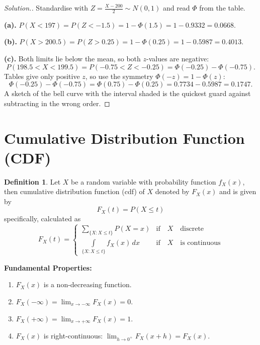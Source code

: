 \documentclass[12pt,a4paper]{report}
\theoremstyle{definition}
\newtheorem{definition}[thm]{Definition}
\theoremstyle{plain}
\theoremstyle{definition}
\newenvironment{solution}
  {\renewcommand{\qedsymbol}{}\begin{proof}[\textit{Solution}.]}
  {\end{proof}}
\begin{document}
\begin{solution}
Standardise with $Z = \frac{X-200}{2}\sim N(0,1)$ and read $\Phi$ from the table.

\textbf{(a).} $P(X<197) = P(Z<-1.5) = 1-\Phi(1.5) = 1-0.9332 = 0.0668.$

\textbf{(b).} $P(X>200.5) = P(Z>0.25) = 1-\Phi(0.25) = 1-0.5987 = 0.4013.$

\textbf{(c).} Both limits lie below the mean, so both $z$-values are negative:
\[P(198.5<X<199.5) = P(-0.75<Z<-0.25) = \Phi(-0.25)-\Phi(-0.75).\]
Tables give only positive $z$, so use the symmetry $\Phi(-z) = 1-\Phi(z)$:
\[\Phi(-0.25)-\Phi(-0.75) = \Phi(0.75)-\Phi(0.25) = 0.7734-0.5987 = 0.1747.\]
A sketch of the bell curve with the interval shaded is the quickest guard against
subtracting in the wrong order.
\end{solution}


\section{Cumulative Distribution Function (CDF)}
\begin{definition}
Let $X$ be a random variable with probability function $f_X(x)$, then cumulative distribution function (cdf) of $X$ denoted by $F_X(x)$ and is given by
\[F_X(t)=P(X\leq t)\] 
specifically, calculated as
\[F_X(t)=
\begin{cases}
\sum\limits_{\{X:X\leq t\}}P(X=x) & \text{if}\quad X \quad\text{discrete}\\
\displaystyle{\int\limits_{\{X:X\leq t\}}}f_X(x)\, dx & \text{if}\quad X \quad\text{is continuous}
\end{cases}
\]
\end{definition}


\textbf{Fundamental Properties:}
\begin{enumerate}
\item $F_X(x)$ is a non-decreasing function.
\item $F_X(-\infty) = \lim_{x \to -\infty} F_X(x) = 0$.
\item $F_X(+\infty) = \lim_{x \to +\infty} F_X(x) = 1$.
\item $F_X(x)$ is right-continuous: $\lim_{h \to 0^+} F_X(x+h) = F_X(x)$.\\
\end{enumerate}
\end{document}
